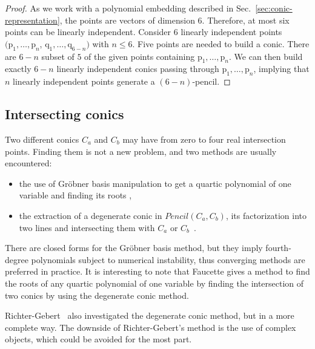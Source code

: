 \documentclass{birkjour}
\begin{document}
\begin{proof}
  As we work with a polynomial embedding described in Sec.~\ref{sec:conic-representation}, the points are vectors of dimension 6. Therefore, at most six points can be linearly independent.
    Consider \(6\) linearly independent points \((\mathrm{p}_1,\dots,\mathrm{p}_n\), \(\mathrm{q}_{1}, \dots,\mathrm{q}_{6-n})\) with \(n \leqslant 6\). 
    Five points are needed to build a conic. 
    There are \(6-n\) subset of \(5\) of the given points containing \(\mathrm{p}_1,\dots,\mathrm{p}_n\). We can then build exactly \(6-n\) linearly independent conics passing through \(\mathrm{p}_1,\dots,\mathrm{p}_n\), implying that \(n\) linearly independent points generate a \((6-n)\)-pencil.
\end{proof}





\subsection{Intersecting conics}
Two different conics \(C_a\) and \(C_b\) may have from zero to four real intersection points. Finding them is not a new problem, and two methods are usually encountered:
\begin{itemize}
    \item the use of Gröbner basis manipulation to get a quartic polynomial of one variable and finding its roots \cite{heck_birds-eye_2003},
    \item the extraction of a degenerate conic in \(Pencil(C_a, C_b)\), its factorization into two lines and intersecting them with \(C_a\) or \(C_b\)~\cite{richter-gebert_perspectives_2011}.
\end{itemize}

There are closed forms for the Gröbner basis method, but they imply fourth-degree polynomials subject to numerical instability, thus converging methods are preferred in practice. It is interesting to note that Faucette \cite{faucette_geometric_1996} gives a method to find the roots of any quartic polynomial of one variable by finding the intersection of two conics by using the degenerate conic method.%

Richter-Gebert~\cite{richter-gebert_perspectives_2011} also investigated the degenerate conic method, but in a more complete way. The downside of Richter-Gebert's method is the use of complex objects, which could be avoided for the most part.
\end{document}
